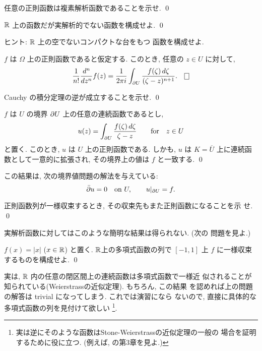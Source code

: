 \documentclass[12pt,twoside]{jarticle}
\begin{document}
\begin{question}
  任意の正則函数は複素解析函数であることを示せ. \qed
\end{question}


\begin{question}
  ${\mathbb R}$ 上の\Class{\infty}函数だが実解析的でない函数を構成せよ. 
  \qed
\end{question}

\noindent ヒント: ${\mathbb R}$ 上の空でないコンパクトな台をもつ\Class{\infty}
函数を構成せよ. 


\begin{question}
  $f$ は $\Omega$ 上の正則函数であると仮定する. %
  このとき, 任意の $z\in U$ に対して,
  \[
    \frac{1}{n!} \frac{d^n}{dz^n}f(z)
    =
    \frac{1}{2\pi i}
    \int_{\del U} \frac{f(\zeta)\,d\zeta}{(\zeta - z)^{n+1}}.
    \qed
  \]%
\end{question}


\begin{question}
  Cauchy の積分定理の逆が成立することを示せ. \qed
\end{question}


\begin{question}\qstar{*}
  $f$ は $U$ の境界 $\partial U$ 上の任意の連続函数であるとし, 
  \[
    u(z) = \int_{\partial U} \frac{f(\zeta)\,d\zeta}{\zeta - z}
    \qquad
    \text{for}\quad z\in U
  \]%
  と置く. このとき, $u$ は $U$ 上の正則函数である. %
  しかも, $u$ は $K = \overline{U}$ 上に連続函数として一意的に拡張され, 
  その境界上の値は $f$ と一致する. \qed
\end{question}

\noindent この結果は, 次の境界値問題の解法を与えている:
\[
  {\bar\partial} u = 0 \quad\text{on}\ U,
  \qquad
  u|_{\partial U} = f.
\]


\begin{question}\qstar{*}
  正則函数列が一様収束するとき, その収束先もまた正則函数になることを示
  せ. \qed
\end{question}

\noindent 実解析函数に対してはこのような簡明な結果は得られない. (次の
問題を見よ.)

\begin{question}
  $f(x)=|x|$ ($x\in{\mathbb R}$) と置く. ${\mathbb R}$上の多項式函数の列で $[-1,1]$ 上 
  $f$ に一様収束するものを構成せよ. \qed
\end{question}

\noindent 実は, ${\mathbb R}$ 内の任意の閉区間上の連続函数は多項式函数で一様近
似されることが知られている(Weierstrassの近似定理). もちろん, この結果
を認めれば上の問題の解答は trivial になってしまう. これでは演習になら
ないので, 直接に具体的な多項式函数の列を見付けて欲しい%
\footnote{実は逆にそのような函数はStone-Weierstrassの近似定理の一般の
  場合を証明するために役に立つ. (例えば, \cite{Lang}の第3章を見よ.)}.
\end{document}
